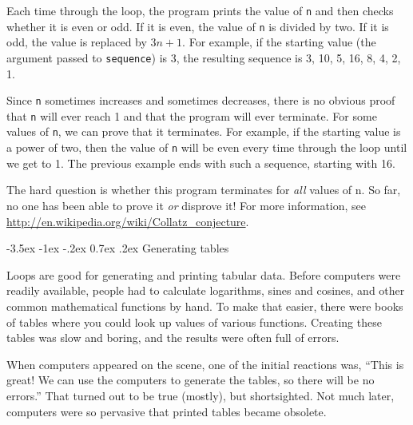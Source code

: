 \documentclass[12pt]{book}
\makeatletter
\theoremstyle{exercise}
\newcommand{\java}[1]{\verb"#1"}
\renewcommand{\section}{\@startsection{section}{1}{\z@}%
    {-3.5ex \@plus -1ex \@minus -.2ex}%
    {0.7ex \@plus.2ex}%
    {\normalfont\Large\bfseries}}
\newcommand{\java}[1]{\lstinline{#1}} %
\makeatother
\begin{document}

Each time through the loop, the program prints the value of \java{n} and then checks whether it is even or odd.
If it is even, the value of \java{n} is divided by two.
If it is odd, the value is replaced by $3n+1$.
For example, if the starting value (the argument passed to \java{sequence}) is 3, the resulting sequence is 3, 10, 5, 16, 8, 4, 2, 1.

Since \java{n} sometimes increases and sometimes decreases, there is no obvious proof that \java{n} will ever reach 1 and that the program will ever terminate.
For some values of \java{n}, we can prove that it terminates.
For example, if the starting value is a power of two, then the value of \java{n} will be even every time through the loop until we get to 1.
The previous example ends with such a sequence, starting with 16.

The hard question is whether this program terminates for {\em all} values of n.
So far, no one has been able to prove it {\em or} disprove it!
For more information, see \url{http://en.wikipedia.org/wiki/Collatz_conjecture}.


\section{Generating tables}


Loops are good for generating and printing tabular data.
Before computers were readily available, people had to calculate logarithms, sines and cosines, and other common mathematical functions by hand.
To make that easier, there were books of tables where you could look up values of various functions.
Creating these tables was slow and boring, and the results were often full of errors.

When computers appeared on the scene, one of the initial reactions was, ``This is great!
We can use the computers to generate the tables, so there will be no errors.''
That turned out to be true (mostly), but shortsighted.
Not much later, computers were so pervasive that printed tables became obsolete.
\end{document}
